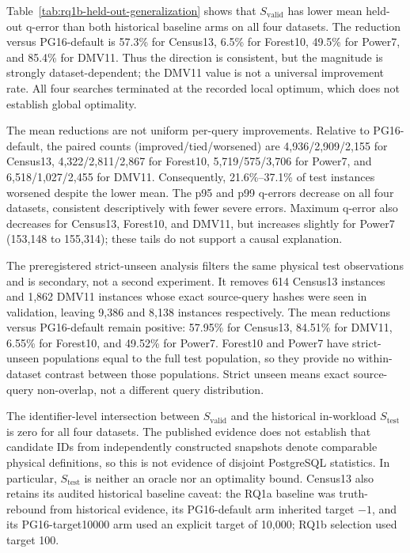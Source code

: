 

Table~\ref{tab:rq1b-held-out-generalization} shows that $S_{\mathrm{valid}}$
has lower mean held-out q-error than both historical baseline arms on all four
datasets. The reduction versus PG16-default is 57.3\% for Census13, 6.5\%
for Forest10, 49.5\% for Power7, and 85.4\% for DMV11. Thus the direction is
consistent, but the magnitude is strongly dataset-dependent; the DMV11 value
is not a universal improvement rate. All four searches terminated at the
recorded local optimum, which does not establish global optimality.

The mean reductions are not uniform per-query improvements. Relative to
PG16-default, the paired counts (improved/tied/worsened) are 4,936/2,909/2,155
for Census13, 4,322/2,811/2,867 for Forest10, 5,719/575/3,706 for Power7, and
6,518/1,027/2,455 for DMV11. Consequently, 21.6\%--37.1\% of test instances
worsened despite the lower mean. The p95 and p99 q-errors decrease on all four
datasets, consistent descriptively with fewer severe errors. Maximum q-error
also decreases for Census13, Forest10, and DMV11, but increases slightly for
Power7 (153,148 to 155,314); these tails do not support a causal explanation.

The preregistered strict-unseen analysis filters the same physical test
observations and is secondary, not a second experiment. It removes 614
Census13 instances and 1,862 DMV11 instances whose exact source-query hashes
were seen in validation, leaving 9,386 and 8,138 instances respectively. The
mean reductions versus PG16-default remain positive: 57.95\% for Census13,
84.51\% for DMV11, 6.55\% for Forest10, and 49.52\% for Power7. Forest10 and
Power7 have strict-unseen populations equal to the full test population, so
they provide no within-dataset contrast between those populations. Strict
unseen means exact source-query non-overlap, not a different query
distribution.

The identifier-level intersection between $S_{\mathrm{valid}}$ and the
historical in-workload $S_{\mathrm{test}}$ is zero for all four datasets. The
published evidence does not establish that candidate IDs from independently
constructed snapshots denote comparable physical definitions, so this is not
evidence of disjoint PostgreSQL statistics. In particular, $S_{\mathrm{test}}$
is neither an oracle nor an optimality bound. Census13 also retains its
audited historical baseline caveat: the RQ1a baseline was truth-rebound from
historical evidence, its PG16-default arm inherited target $-1$, and its
PG16-target10000 arm used an explicit target of 10,000; RQ1b selection used
target 100.

